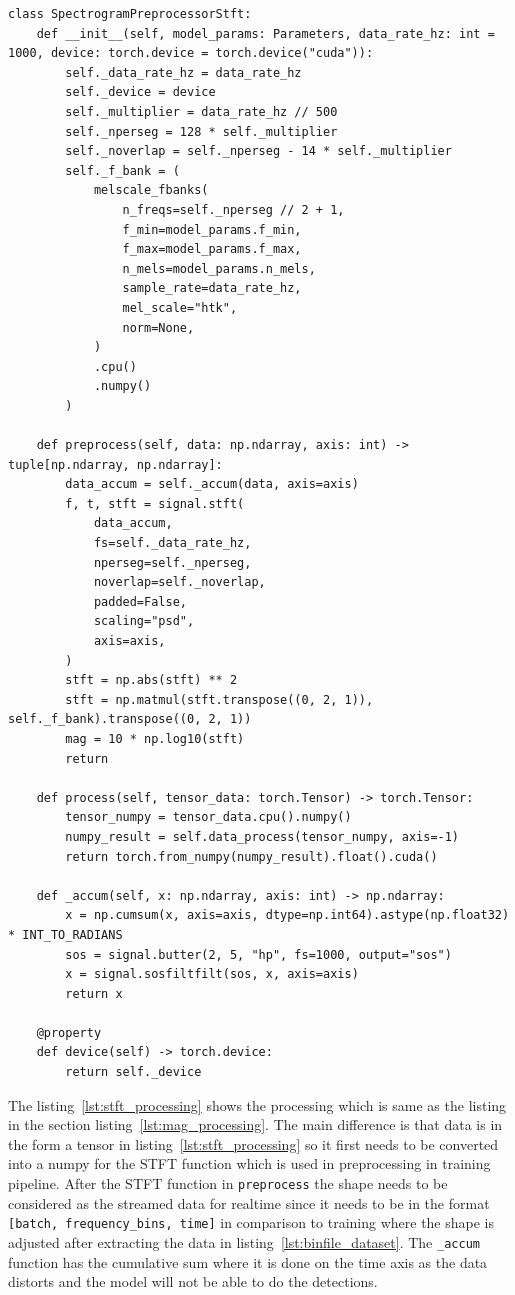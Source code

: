 \begin{lstlisting}[style=pythonstyle, caption={Preprocessing for conversion of raw phase data to spectrogram in the framework}, label=lst:stft_processing]
class SpectrogramPreprocessorStft:
    def __init__(self, model_params: Parameters, data_rate_hz: int = 1000, device: torch.device = torch.device("cuda")):
        self._data_rate_hz = data_rate_hz
        self._device = device
        self._multiplier = data_rate_hz // 500
        self._nperseg = 128 * self._multiplier
        self._noverlap = self._nperseg - 14 * self._multiplier
        self._f_bank = (
            melscale_fbanks(
                n_freqs=self._nperseg // 2 + 1,
                f_min=model_params.f_min,
                f_max=model_params.f_max,
                n_mels=model_params.n_mels,
                sample_rate=data_rate_hz,
                mel_scale="htk",
                norm=None,
            )
            .cpu()
            .numpy()
        )

    def preprocess(self, data: np.ndarray, axis: int) -> tuple[np.ndarray, np.ndarray]:
        data_accum = self._accum(data, axis=axis)
        f, t, stft = signal.stft(
            data_accum,
            fs=self._data_rate_hz,
            nperseg=self._nperseg,
            noverlap=self._noverlap,
            padded=False,
            scaling="psd",
            axis=axis,
        )
        stft = np.abs(stft) ** 2
        stft = np.matmul(stft.transpose((0, 2, 1)), self._f_bank).transpose((0, 2, 1))
        mag = 10 * np.log10(stft)
        return 

    def process(self, tensor_data: torch.Tensor) -> torch.Tensor:  
        tensor_numpy = tensor_data.cpu().numpy()
        numpy_result = self.data_process(tensor_numpy, axis=-1)
        return torch.from_numpy(numpy_result).float().cuda()  

    def _accum(self, x: np.ndarray, axis: int) -> np.ndarray:
        x = np.cumsum(x, axis=axis, dtype=np.int64).astype(np.float32) * INT_TO_RADIANS
        sos = signal.butter(2, 5, "hp", fs=1000, output="sos")
        x = signal.sosfiltfilt(sos, x, axis=axis)
        return x

    @property
    def device(self) -> torch.device:
        return self._device

\end{lstlisting}

The listing~\ref{lst:stft_processing} shows the processing which is same as the listing in the section listing~\ref{lst:mag_processing}. The main difference is that data is in the form a tensor in listing~\ref{lst:stft_processing} so it first needs to be converted into a numpy for the STFT function which is used in preprocessing in training pipeline. After the STFT function in \texttt{preprocess} the shape needs to be considered as the streamed data for realtime since it needs to be in the format \texttt{[batch, frequency\_bins, time]} in comparison to training where the shape is adjusted after extracting the data in listing~\ref{lst:binfile_dataset}. The \texttt{\_accum} function has the cumulative sum where it is done on the time axis as the data distorts and the model will not be able to do the detections.

